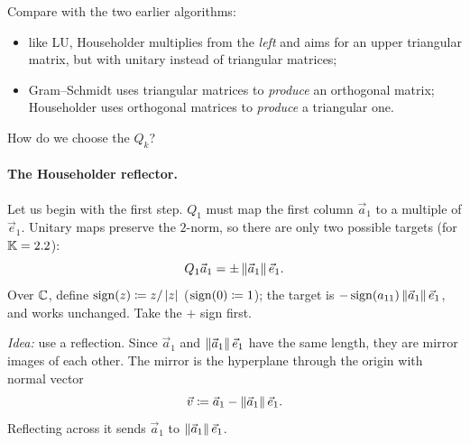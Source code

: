 \pagebreak
Compare with the two earlier algorithms:
\begin{itemize}
  \item like LU, Householder multiplies from the \emph{left} and aims for an upper triangular matrix, but with unitary instead of triangular matrices;
  \item Gram--Schmidt uses triangular matrices to \emph{produce} an orthogonal matrix; Householder uses orthogonal matrices to \emph{produce} a triangular one.
\end{itemize}

How do we choose the $Q_k$?

\paragraph{The Householder reflector.} Let us begin with the first step. $Q_1$ must map the first column $\vec{a}_1$ to a multiple of $\vec{e}_1$. Unitary maps preserve the $2$-norm, so there are only two possible targets (for $\mathbb{K} = 2.2$):
\begin{equation}
  Q_1\vec{a}_1 = \pm\left\lVert \vec{a}_1 \right\rVert\vec{e}_1.
\end{equation}
Over $\mathbb{C}$, define $\operatorname{sign}(z) \coloneqq z/\left\lvert z \right\rvert$ ($\operatorname{sign}(0) \coloneqq 1$); the target is $-\operatorname{sign}(a_{11})\left\lVert \vec{a}_1 \right\rVert\vec{e}_1$, and  works unchanged.
Take the $+$ sign first.

\emph{Idea:} use a reflection. Since $\vec{a}_1$ and $\left\lVert \vec{a}_1 \right\rVert\vec{e}_1$ have the same length, they are mirror images of each other. The mirror is the hyperplane through the origin with normal vector
\begin{equation}
  \vec{v} \coloneqq \vec{a}_1 - \left\lVert \vec{a}_1 \right\rVert\vec{e}_1.
\end{equation}
Reflecting across it sends $\vec{a}_1$ to $\left\lVert \vec{a}_1 \right\rVert\vec{e}_1$.

\begin{center}
\end{center}

